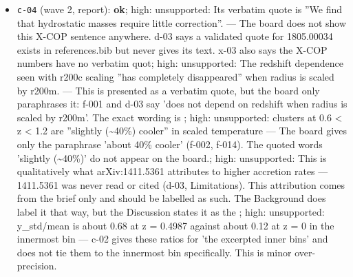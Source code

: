 \documentclass[11pt,a4paper]{article}
\begin{document}
\begin{itemize}
  \item \texttt{c-04} (wave 2, report): \textbf{ok}; high: unsupported: Its verbatim quote is ''We find that hydrostatic masses require little correction''. --- The board does not show this X-COP sentence anywhere. d-03 says a validated quote for 1805.00034 exists in references.bib but never gives its text. x-03 also says the X-COP numbers have no verbatim quot; high: unsupported: The redshift dependence seen with r200c scaling ''has completely disappeared'' when radius is scaled by r200m. --- This is presented as a verbatim quote, but the board only paraphrases it: f-001 and d-03 say 'does not depend on redshift when radius is scaled by r200m'. The exact wording is ; high: unsupported: clusters at 0.6 \textless{} z \textless{} 1.2 are ''slightly (\textasciitilde{}40\%) cooler'' in scaled temperature --- The board gives only the paraphrase 'about 40\% cooler' (f-002, f-014). The quoted words 'slightly (\textasciitilde{}40\%)' do not appear on the board.; high: unsupported: This is qualitatively what arXiv:1411.5361 attributes to higher accretion rates --- 1411.5361 was never read or cited (d-03, Limitations). This attribution comes from the brief only and should be labelled as such. The Background does label it that way, but the Discussion states it as the ; high: unsupported: y\_std/mean is about 0.68 at z = 0.4987 against about 0.12 at z = 0 in the innermost bin --- c-02 gives these ratios for 'the excerpted inner bins' and does not tie them to the innermost bin specifically. This is minor over-precision.
\end{itemize}
\end{document}
